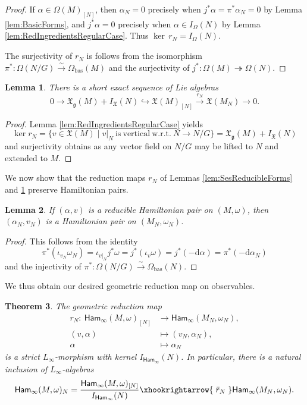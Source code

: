 \documentclass[10pt,a4paper]{amsart}
\numberwithin{equation}{section}
\newtheorem{Theorem}{Theorem}[section]
\newtheorem{Lemma}[Theorem]{Lemma}
\newcommand{\g}{\mathfrak{g}}
\newcommand{\Ham}{\mathsf{Ham}}
\newcommand{\fgmodule}{\mathfrak{X}_{\g}}
\newcommand{\vanvf}{I_{\mathfrak{X}}(N)}%
\newcommand{\X}{\mathfrak{X}}
\renewcommand{\d}{\mathrm{d}}
\begin{document}
\begin{proof}
	If $\alpha\in\Omega(M)_{[N]}$, then $\alpha_N = 0$ precisely when $j^*\alpha=\pi^*\alpha_N=0$ by Lemma \ref{lem:BasicForms}, and $j^*\alpha=0$ precisely when $\alpha\in I_\Omega(N)$ by Lemma \ref{lem:RedIngredientsRegularCase}. Thus $\ker\,r_N= I_\Omega(N)$.

	The surjectivity of $r_N$ is follows from the isomorphism $\pi^*\colon \Omega(N/G)\xrightarrow{\sim}\Omega_{\mathrm{bas}}(M)$ and the surjectivity of $j^*\colon \Omega(M)\twoheadrightarrow\Omega(N)$.
\end{proof}

\begin{Lemma}\label{lem:SesReducibleFields}
	There is a short exact sequence of Lie algebras
	\[
		0\to\fgmodule(M)+\vanvf \hookrightarrow \X(M)_{[N]}\xrightarrow{r_N}\mathfrak X(M_N)\to 0.
	\]
\end{Lemma}

\begin{proof}
	Lemma \ref{lem:RedIngredientsRegularCase} yields
	\[
		\ker r_N = \{v\in\X(M) \mid v|_N \mathrm{~is~vertical~w.r.t.~}N\to N/G\} = \fgmodule(M)+\vanvf
	\]
	and surjectivity obtains as any vector field on $N/G$ may be lifted to $N$ and extended to $M$.
\end{proof}

We now show that the reduction maps $r_N$ of Lemmas \ref{lem:SesReducibleForms} and \ref{lem:SesReducibleFields} preserve Hamiltonian pairs.

\begin{Lemma}%
	If $(\alpha,v)$ is a reducible Hamiltonian pair on $(M,\omega)$, then $(\alpha_N,v_N)$ is a Hamiltonian pair on $(M_N,\omega_N)$.
\end{Lemma}

\begin{proof}
	This follows from the identity
	\[
		\pi^*(\iota_{v_N}\omega_N) = \iota_{v|_N} j^* \omega = j^*(\iota_v\omega) = j^*(-\d\alpha) = \pi^*(-\d\alpha_N)
	\]
	and the injectivity of $\pi^*\colon \Omega(N/G)\xrightarrow{\sim}\Omega_{\mathrm{bas}}(N)$.
\end{proof}

We thus obtain our desired geometric reduction map on observables.

\begin{Theorem}\label{thm:MultiSymRed_ManifoldvsObservables}
	The geometric reduction map
	\begin{align*}
		r_N\colon \	\Ham_\infty(M,\omega)_{[N]}	&\to		\Ham_\infty(M_N,\omega_N),		\\
			(v,\alpha) 			&\mapsto	 (v_N,\alpha_N)		,	\\
			\alpha 			&\mapsto	 \alpha_N
	\end{align*}
	is a strict $L_\infty$-morphism with kernel $I_{\Ham_\infty}(N)$. In particular, there is a natural inclusion of $L_\infty$-algebras
	\[
		\Ham_\infty(M,\omega)_N = \frac{\Ham_\infty(M,\omega)_{[N]}}{I_{\Ham_\infty}(N)} \xhookrightarrow{\;\bar{r}_N\;} \Ham_\infty(M_N,\omega_N).
	\]
\end{Theorem}
\end{document}
